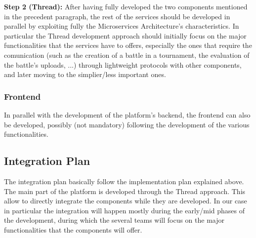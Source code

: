 \documentclass{article}
\begin{document}
{        \textbf{Step 2 (Thread):} After having fully developed the two components mentioned in the
        precedent paragraph, the rest of the services should be developed in parallel by exploiting 
        fully the Microservices Architecture's characteristics. In particular the Thread
        development approach should initially focus on the major functionalities that the services
        have to offers, especially the ones that require the comunication (such as the creation
        of a battle in a tournament, the evaluation of the battle's uploads, ...) through 
        lightweight protocols with other components, and later moving to the simplier/less 
        important ones.

        \subsubsection{Frontend}
        In parallel with the development of the platform's backend, the frontend can also be
        developed, possibly (not mandatory) following the development of the various 
        functionalities.    

    \subsection{Integration Plan}
        The integration plan basically follow the implementation plan explained above.
        The main part of the platform is developed through the Thread approach. This allow to
        directly integrate the components while they are developed.
        In our case in particular the integration will happen mostly during the early/mid phases
        of the development, during which the several teams will focus on the major functionalities
        that the components will offer.

}
\end{document}
